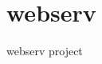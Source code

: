 \chapter{webserv}
\hypertarget{md__r_e_a_d_m_e}{}\label{md__r_e_a_d_m_e}
\label{md__r_e_a_d_m_e_autotoc_md0}%
%


webserv project 